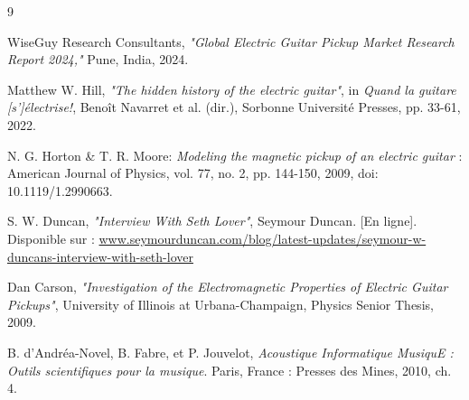 \documentclass[11pt, a4paper]{article}
\begin{document}
\newpage
\begin{thebibliography}{9}

WiseGuy Research Consultants, \textit{"Global Electric Guitar Pickup Market Research Report 2024,"} Pune, India, 2024.

Matthew W. Hill, \textit{"The hidden history of the electric guitar"}, in \textit{Quand la guitare [s']électrise!}, Benoît Navarret et al. (dir.), Sorbonne Université Presses, pp. 33-61, 2022.

N. G. Horton \& T. R. Moore: \textit{Modeling the magnetic pickup of an electric guitar} : American Journal of Physics, vol. 77, no. 2, pp. 144-150, 2009, doi: 10.1119/1.2990663.

S. W. Duncan, \textit{"Interview With Seth Lover"}, Seymour Duncan. [En ligne]. Disponible sur : \url{www.seymourduncan.com/blog/latest-updates/seymour-w-duncans-interview-with-seth-lover}

Dan Carson, \textit{"Investigation of the Electromagnetic Properties of Electric Guitar Pickups"}, University of Illinois at Urbana-Champaign, Physics Senior Thesis, 2009.

B. d'Andréa-Novel, B. Fabre, et P. Jouvelot, \textit{Acoustique Informatique MusiquE : Outils scientifiques pour la musique}. Paris, France : Presses des Mines, 2010, ch. 4.

\end{thebibliography}
\end{document}
